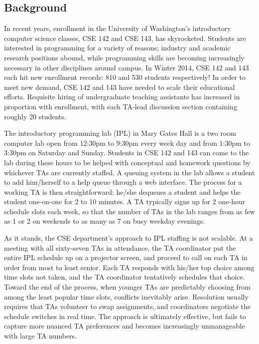 \documentclass{article}
\begin{document}
\setlength\columnsep{0.45in}
\setlength{\parskip}{0.5em}
\begin{multicols}{2}

\section*{Background}

In recent years, enrollment in the University of Washington's introductory computer science classes, CSE 142 and CSE 143, has skyrocketed. Students are interested in programming for a variety of reasons; industry and academic research positions abound, while programming skills are becoming increasingly necessary in other disciplines around campus. In Winter 2014, CSE 142 and 143 each hit new enrollment records: 810 and 530 students respectively! In order to meet new demand, CSE 142 and 143 have needed to scale their educational efforts. Requisite hiring of undergraduate teaching assistants has increased in proportion with enrollment, with each TA-lead discussion section containing roughly 20 students.

The introductory programming lab (IPL) in Mary Gates Hall is a two room computer lab open from 12:30pm to 9:30pm every week day and from 1:30pm to 3:30pm on Saturday and Sunday. Students in CSE 142 and 143 can come to the lab during these hours to be helped with conceptual and homework questions by whichever TAs are currently staffed. A queuing system in the lab allows a student to add him/herself to a help queue through a web interface. The process for a working TA is then straightforward: he/she dequeues a student and helps the student one-on-one for 2 to 10 minutes. A TA typically signs up for 2 one-hour schedule slots each week, so that the number of TAs in the lab ranges from as few as 1 or 2 on weekends to as many as 7 on busy weekday evenings.

As it stands, the CSE department's approach to IPL staffing is not scalable. At a meeting with all sixty-seven TAs in attendance, the TA coordinator put the entire IPL schedule up on a projector screen, and proceed to call on each TA in order from most to least senior. Each TA responds with his/her top choice among time slots not taken, and the TA coordinator tentatively schedules that choice. Toward the end of the process, when younger TAs are predictably choosing from among the least popular time slots, conflicts inevitably arise. Resolution usually requires that TAs volunteer to swap assignments, and coordinators negotiate the schedule switches in real time. The approach is ultimately effective, but fails to capture more nuanced TA preferences and becomes increasingly unmanageable with large TA numbers.


\end{multicols}
\end{document}
